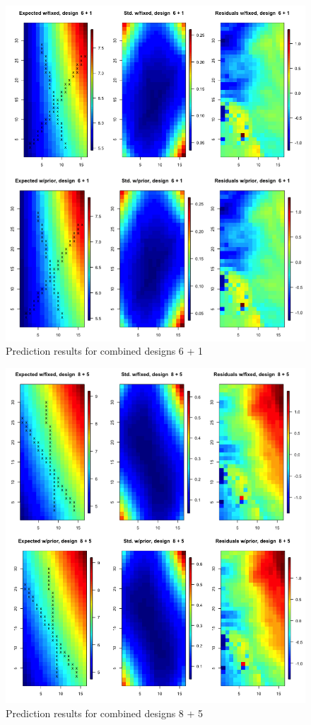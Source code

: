 \newpage
\begin{figure}[!ht]
	\centering
	\includegraphics[width=0.6\linewidth]{figurer/final61.png}
    \caption{Prediction results for combined designs 6 + 1}
    \label{fig:results_61}
\end{figure}

\begin{figure}[!ht]
	\centering
	\includegraphics[width=0.6\linewidth]{figurer/final85.png}
    \caption{Prediction results for combined designs 8 + 5}
    \label{fig:results_85}
\end{figure}

\newpage

